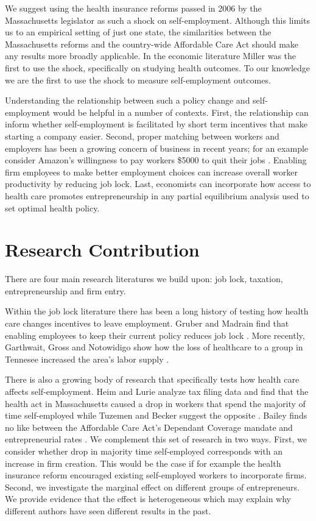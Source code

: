 \documentclass[12pt]{article}
\begin{document}
We suggest using the health insurance reforms passed in 2006 by the Massachusetts legislator as such a shock on self-employment. Although this limits us to an empirical setting of just one state, the similarities between the Massachusetts reforms and the country-wide Affordable Care Act should make any results more broadly applicable. In the economic literature Miller \cite{miller} was the first to use the shock, specifically on studying health outcomes. To our knowledge we are the first to use the shock to measure self-employment outcomes. 

Understanding the relationship between such a policy change and self-employment would be helpful in a number of contexts. First, the relationship can inform whether self-employment is facilitated by short term incentives that make starting a company easier. Second, proper matching between workers and employers has been a growing concern of business in recent years; for an example consider Amazon's willingness to pay workers \$5000 to quit their jobs \cite{bezos}. Enabling firm employees to make better employment choices can increase overall worker productivity by reducing job lock.  Last, economists can incorporate how access to health care promotes entrepreneurship in any partial equilibrium analysis used to set optimal health policy. 

\section{Research Contribution}

There are four main research literatures we build upon: job lock, taxation, entrepreneurship and firm entry.

Within the job lock literature there has been a long history of testing how health care changes incentives to leave employment. Gruber and Madrain find that enabling employees to keep their current policy reduces job lock \cite{gruberMadrian}. More recently, 
Garthwait, Gross and Notowidigo show how the loss of healthcare to a group in Tennesee increased the area's labor supply \cite{garthwaite}. 

There is also a growing body of research that specifically tests how health care affects self-employment. Heim and Lurie analyze tax filing data and find that the health act in Massachusetts caused a drop in workers that spend the majority of time self-employed \cite{heimLurie} while Tuzemen and Becker suggest the opposite \cite{tuzemen}. Bailey finds no like between the Affordable Care Act's Dependant Coverage mandate and entrepreneurial rates \cite{bailey}. We complement this set of research in two ways. First, we consider whether drop in majority time self-employed corresponds with an increase in firm creation. This would be the case if for example the health insurance reform encouraged existing self-employed workers to incorporate firms. Second, we investigate the marginal effect on different groups of entrepreneurs. We provide evidence that the effect is heterogeneous which may explain why different authors have seen different results in the past.
\end{document}
